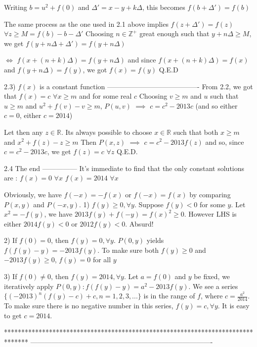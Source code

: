 \begin{solution}
Writing $b=u^2+f(0)$ and $\Delta'=x-y+k\Delta$, this becomes $f(b+\Delta')=f(b)$

The same process as the one used in 2.1 above implies $f(z+\Delta')=f(z)$ $\forall z\ge M=f(b)-b-\Delta'$
Choosing $n\in\mathbb Z^+$ great enough such that $y+n\Delta \ge M$, we get $f(y+n\Delta+\Delta')=f(y+n\Delta)$

$\iff$ $f(x+(n+k)\Delta)=f(y+n\Delta)$ and since $f(x+(n+k)\Delta)=f(x)$ and $f(y+n\Delta)=f(y)$, we got $f(x)=f(y)$
Q.E.D

2.3) $f(x)$ is a constant function
----------------------------------------
From 2.2, we got that $f(x)=c$ $\forall x\ge m$ and for some real $c$
Choosing $v\ge m$ and $u$ such that $u\ge m$ and $u^2+f(v)-v\ge m$, $P(u,v)$ $\implies$ $c=c^2-2013c$ (and so either $c=0$, either $c=2014$)

Let then any $z\in\mathbb R$. Its always possible to choose $x\in\mathbb R$ such that both $x\ge m$ and $x^2+f(z)-z\ge m$
Then $P(x,z)$ $\implies$ $c=c^2-2013f(z)$ and so, since $c=c^2-2013c$, we get $f(z)=c$ $\forall z$
Q.E.D.

2.4 The end
---------------
It's immediate to find that the only constant solutions are :
$f(x)=0$ $\forall x$
$f(x)=2014$ $\forall x$
\end{solution}



\begin{solution}
	Obviously, we have $f(-x)=-f(x)$ or $f(-x)=f(x)$ by comparing $P(x,y)$ and $P(-x,y)$.
1) $f(y)\geq0,\forall y$.
Suppose $f(y)<0$ for some $y$. Let $x^2=-f(y)$, we have $2013f(y)+f(-y)=f(x)^2\geq0$. However LHS is either $2014f(y)<0$ or $2012f(y)<0$. Absurd!

2) If $f(0)=0$, then $f(y)=0,\forall y$.
$P(0,y)$ yields $f(f(y)-y)=-2013f(y)$. To make sure both $f(y)\geq0$ and $-2013f(y)\geq0$, $f(y)=0$ for all $y$

3) If $f(0)\neq0$, then $f(y)=2014,\forall y$. 
Let $a=f(0)$ and $y$ be fixed, we iteratively apply $P(0,y): f(f(y)-y)=a^2-2013f(y)$. We see a series $\{(-2013)^n(f(y)-c)+c,n=1,2,3,...\}$ is in the range of $f$, where $c=\frac{a^2}{2014}$. To make sure there is no negative number in this series, $f(y)=c,\forall y$. It is easy to get $c=2014$.
\end{solution}
*******************************************************************************
-------------------------------------------------------------------------------

